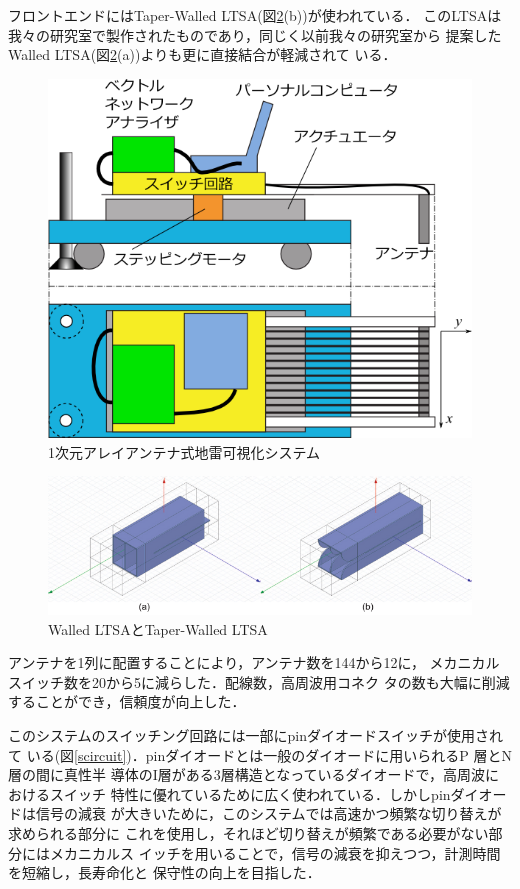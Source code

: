 ﻿\documentclass[12pt,oneside]{jsbook}
\begin{document}
フロントエンドにはTaper-Walled LTSA(図\ref{pic:twltsa}(b))が使われている．
このLTSAは我々の研究室で製作されたものであり，同じく以前我々の研究室から
提案したWalled LTSA(図\ref{pic:twltsa}(a))よりも更に直接結合が軽減されて
いる\cite{2011Nakano}．
\begin{figure}[btp]
 \begin{center}
\includegraphics[width =0.6\hsize ]{so2.png}
\caption{1次元アレイアンテナ式地雷可視化システム}
\label{so2}
  \end{center}
\end{figure}
\begin{figure}[btp]
\begin{center}
\includegraphics[width =\hsize]{walled-taper.png}
\caption{Walled LTSAとTaper-Walled LTSA} \label{pic:twltsa} 
\end{center}
\end{figure}
アンテナを1列に配置することにより，アンテナ数を144から12に，
メカニカルスイッチ数を20から5に減らした．配線数，高周波用コネク
タの数も大幅に削減することができ，信頼度が向上した．

このシステムのスイッチング回路には一部にpinダイオードスイッチが使用されて
いる(図\ref{scircuit})．pinダイオードとは一般のダイオードに用いられるP
層とN層の間に真性半
導体のI層がある3層構造となっているダイオードで，高周波におけるスイッチ
特性に優れているために広く使われている．しかしpinダイオードは信号の減衰
が大きいために，このシステムでは高速かつ頻繁な切り替えが求められる部分に
これを使用し，それほど切り替えが頻繁である必要がない部分にはメカニカルス
イッチを用いることで，信号の減衰を抑えつつ，計測時間を短縮し，長寿命化と
保守性の向上を目指した．
\end{document}
